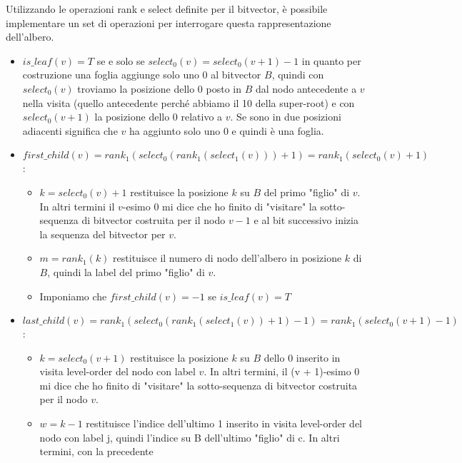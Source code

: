 Utilizzando le operazioni rank e select definite per il bitvector, è possibile
implementare un set di operazioni per interrogare questa rappresentazione dell'albero.
\begin{itemize}
    \item $is\_leaf(v) = T$ se e solo se $select_0(v) = select_0(v + 1) - 1$ in
          quanto per costruzione una foglia aggiunge solo uno 0 al bitvector $B$, quindi
          con $select_0(v)$ troviamo la posizione dello 0 posto in $B$ dal nodo antecedente
          a $v$ nella visita (quello antecedente perché abbiamo il 10 della super-root) e
          con $select_0(v + 1)$ la posizione dello 0 relativo a $v$. Se sono in due posizioni
          adiacenti significa che $v$ ha aggiunto solo uno $0$ e quindi è una foglia.
    \item $first\_child(v) = rank_1(select_0(rank_1(select_1(v)))+1) = rank_1(select_0(v)+1)$:
          \begin{itemize}
              \item $k = select_0(v) + 1$ restituisce la posizione $k$ su $B$ del
                    primo "figlio" di $v$. In altri termini il $v$-esimo 0 mi dice che
                    ho finito di "visitare" la sotto-sequenza di bitvector costruita per
                    il nodo $v - 1$ e al bit successivo inizia la sequenza del bitvector per $v$.
              \item $m = rank_1(k)$ restituisce il numero di nodo dell'albero in
                    posizione $k$ di $B$, quindi la label del primo "figlio" di $v$.
              \item Imponiamo che $first\_child(v) = - 1$ se $is\_leaf (v) = T$
          \end{itemize}
    \item $last\_child(v) = rank_1(select_0(rank_1(select_1(v))+1)-1) = rank_1(select_0(v+1)-1)$:
          \begin{itemize}
              \item $k = select_0(v + 1)$ restituisce la posizione $k$ su $B$ dello
                    $0$ inserito in visita level-order del nodo con label $v$. In altri
                    termini, il (v + 1)-esimo 0 mi dice che ho finito di "visitare" la
                    sotto-sequenza di bitvector costruita per il nodo $v$.
              \item $w = k - 1$ restituisce l'indice dell'ultimo 1 inserito in
                    visita level-order del nodo con label j, quindi l'indice su B
                    dell'ultimo "figlio" di c. In altri termini, con la precedente

\end{itemize}
\end{itemize}
